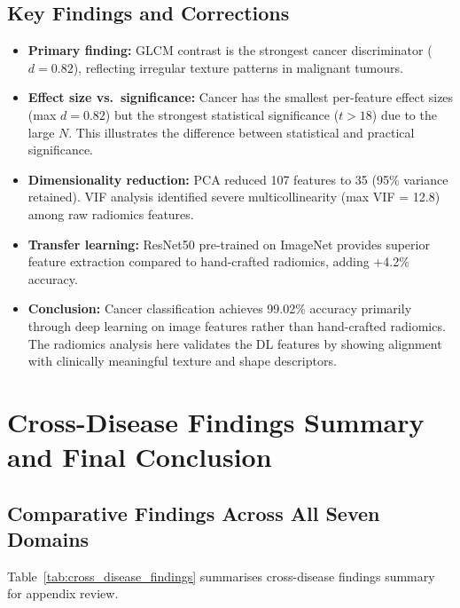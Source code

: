 \subsection{Key Findings and Corrections}

\begin{itemize}
\item \textbf{Primary finding:} GLCM contrast is the strongest cancer discriminator ($d = 0.82$), reflecting irregular texture patterns in malignant tumours.
\item \textbf{Effect size vs.\ significance:} Cancer has the smallest per-feature effect sizes (max $d = 0.82$) but the strongest statistical significance ($t > 18$) due to the large $N$. This illustrates the difference between statistical and practical significance.
\item \textbf{Dimensionality reduction:} PCA reduced 107 features to 35 (95\% variance retained). VIF analysis identified severe multicollinearity (max VIF = 12.8) among raw radiomics features.
\item \textbf{Transfer learning:} ResNet50 pre-trained on ImageNet provides superior feature extraction compared to hand-crafted radiomics, adding +4.2\% accuracy.
\item \textbf{Conclusion:} Cancer classification achieves 99.02\% accuracy primarily through deep learning on image features rather than hand-crafted radiomics. The radiomics analysis here validates the DL features by showing alignment with clinically meaningful texture and shape descriptors.
\end{itemize}

\section{Cross-Disease Findings Summary and Final Conclusion}
\label{app:final_conclusion}

\subsection{Comparative Findings Across All Seven Domains}

\begingroup\singlespacing\tablefontsize
\noindent Table~\ref{tab:cross_disease_findings} summarises cross-disease findings summary for appendix review.

